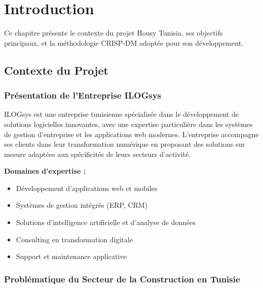 \documentclass[12pt, a4paper]{report}
\begin{document}

\newpage
{}
\setcounter{page}{1}

\chapter{Introduction}

\begin{objectivebox}
Ce chapitre présente le contexte du projet Housy Tunisia, ses objectifs principaux, et la méthodologie CRISP-DM adoptée pour son développement.
\end{objectivebox}

\section{Contexte du Projet}

\subsection{Présentation de l'Entreprise ILOGsys}

ILOGsys est une entreprise tunisienne spécialisée dans le développement de solutions logicielles innovantes, avec une expertise particulière dans les systèmes de gestion d'entreprise et les applications web modernes. L'entreprise accompagne ses clients dans leur transformation numérique en proposant des solutions sur mesure adaptées aux spécificités de leurs secteurs d'activité.

\textbf{Domaines d'expertise :}
\begin{itemize}
    \item Développement d'applications web et mobiles
    \item Systèmes de gestion intégrés (ERP, CRM)
    \item Solutions d'intelligence artificielle et d'analyse de données
    \item Consulting en transformation digitale
    \item Support et maintenance applicative
\end{itemize}

\subsection{Problématique du Secteur de la Construction en Tunisie}
\end{document}
